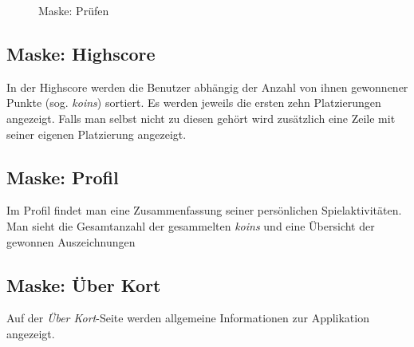 \begin{figure}[H]
\hfill
{}
\caption{Maske: Prüfen}
\end{figure}

\subsection{Maske: Highscore}
In der Highscore werden die Benutzer abhängig der Anzahl von ihnen gewonnener Punkte (sog. \emph{koins}) sortiert.
Es werden jeweils die ersten zehn Platzierungen angezeigt. Falls man selbst nicht zu diesen gehört wird zusätzlich eine Zeile mit seiner eigenen Platzierung angezeigt.

\subsection{Maske: Profil}
Im Profil findet man eine Zusammenfassung seiner persönlichen Spielaktivitäten.
Man sieht die Gesamtanzahl der gesammelten \emph{koins} und eine Übersicht der gewonnen Auszeichnungen

\subsection{Maske: Über Kort}
Auf der \emph{Über Kort}-Seite werden allgemeine Informationen zur Applikation angezeigt.

